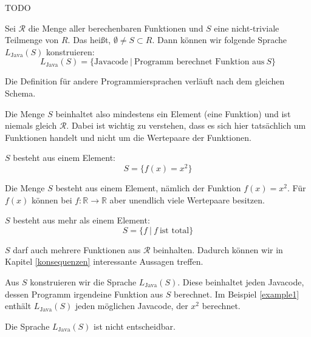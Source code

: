 \documentclass[journal]{IEEEtran}
\begin{document}
TODO

\begin{definition}
\label{defls}
Sei $\mathcal{R}$ die Menge aller berechenbaren Funktionen und $S$ eine nicht-triviale Teilmenge von $R$. Das heißt, $\emptyset \ne S \subset R$. Dann können wir folgende Sprache $L_\text{Java}(S)$ konstruieren:
\begin{equation*}
L_\text{Java}(S) = \{ \text{Javacode} \ \vert \ \text{Programm berechnet Funktion aus} \ S \}
\end{equation*}
\end{definition}

Die Definition für andere Programmiersprachen verläuft nach dem gleichen Schema.

Die Menge $S$ beinhaltet also mindestens ein Element (eine Funktion) und ist niemals gleich $\mathcal{R}$. Dabei ist wichtig zu verstehen, dass es sich hier tatsächlich um Funktionen handelt und nicht um die Wertepaare der Funktionen.

\begin{example}
\label{example1}
$S$ besteht aus einem Element:
\begin{equation*}
  S = \{ f(x) = x^2 \}
\end{equation*}
\end{example}

Die Menge $S$ besteht aus einem Element, nämlich der Funktion $f(x) = x^2$. Für $f(x)$ können bei $f\colon \mathbb{R} \to \mathbb{R}$ aber unendlich viele Wertepaare besitzen.

\begin{example}
\label{example2}
$S$ besteht aus mehr als einem Element:
\begin{equation*}
  S = \{f \ \vert \ f \ \text{ist total}\}
\end{equation*}
\end{example}

$S$ darf auch mehrere Funktionen aus $\mathcal{R}$ beinhalten. Dadurch können wir in Kapitel \ref{konsequenzen} interessante Aussagen treffen.

Aus $S$ konstruieren wir die Sprache $L_\text{Java}(S)$. Diese beinhaltet jeden Javacode, dessen Programm irgendeine Funktion aus $S$ berechnet. Im Beispiel \ref{example1} enthält $L_\text{Java}(S)$ jeden möglichen Javacode, der $x^2$ berechnet.

\begin{theorem}
\label{satzvonricetheorem}
  Die Sprache $L_\text{Java}(S)$ ist nicht entscheidbar.
\end{theorem}
\end{document}
